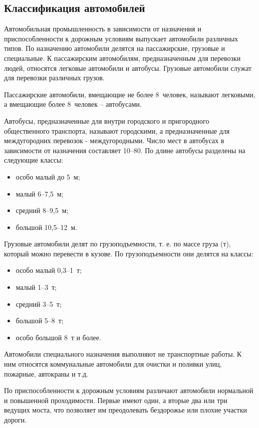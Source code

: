 \subsection{Классификация автомобилей}

Автомобильная промышленность в зависимости от назначения и приспособленности к дорожным условиям выпускает автомобили различных типов. По назначению автомобили делятся на пассажирские, грузовые и специальные. К пассажирским автомобилям, предназначенным для перевозки людей, относятся легковые автомобили и автобусы. Грузовые автомобили служат для перевозки различных грузов. 

Пассажирские автомобили, вмещающие не более 8~человек, называют легковыми, а вмещающие более 8~человек – автобусами.

Автобусы, предназначенные для внутри городского и пригородного общественного транспорта, называют городскими, а предназначенные для междугородних перевозок - междугородными. Число мест в автобусах в зависимости от назначения составляет 10–80.
По длине автобусы разделены на следующие классы:
\begin{itemize}
\item особо малый до 5~м;
\item малый 6–7,5~м;
\item средний 8–9,5~м;
\item большой 10,5–12~м.
\end{itemize}

Грузовые автомобили делят по грузоподъемности, т. е. по массе груза (т), который можно перевести в кузове. По грузоподъемности они делятся на классы:
\begin{itemize}
\item особо малый 0,3–1~т;
\item малый 1–3~т;
\item средний 3–5~т;
\item большой 5–8~т;
\item особо большой 8~т и более.
\end{itemize}

Автомобили специального назначения выполняют не транспортные работы. К ним относятся коммунальные автомобили для очистки и поливки улиц, пожарные, автокраны и т.д.

По приспособленности к дорожным условиям различают автомобили нормальной и повышенной проходимости. Первые имеют один, а вторые два или три ведущих моста, что позволяет им преодолевать бездорожье или плохие участки дороги.

